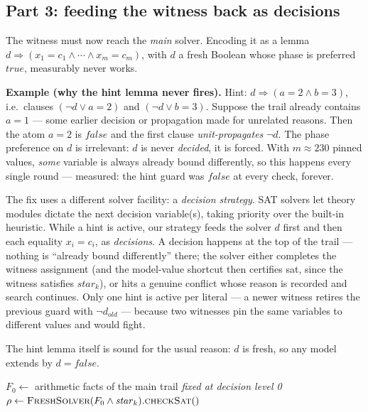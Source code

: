 \documentclass[11pt]{article}
\newcommand{\true}{\ensuremath{\mathit{true}}\xspace}
\newcommand{\false}{\ensuremath{\mathit{false}}\xspace}
\begin{document}
\subsection{Part 3: feeding the witness back as decisions}

The witness must now reach the \emph{main} solver. Encoding it as a lemma
$d \Rightarrow (x_1 = c_1 \wedge \cdots \wedge x_m = c_m)$, with $d$ a
fresh Boolean whose phase is preferred \true, measurably never works.

\begin{exbox}
\textbf{Example (why the hint lemma never fires).} Hint:
$d \Rightarrow (a = 2 \wedge b = 3)$, i.e.\ clauses
$(\neg d \vee a{=}2)$ and $(\neg d \vee b{=}3)$. Suppose the trail
already contains $a = 1$ --- some earlier decision or propagation made for
unrelated reasons. Then the atom $a{=}2$ is \false{} and the first clause
\emph{unit-propagates} $\neg d$. The phase preference on $d$ is
irrelevant: $d$ is never \emph{decided}, it is forced. With $m \approx
230$ pinned values, \emph{some} variable is always already bound
differently, so this happens every single round --- measured: the hint
guard was \false{} at every check, forever.
\end{exbox}

The fix uses a different solver facility: a \emph{decision strategy}. SAT
solvers let theory modules dictate the next decision variable(s), taking
priority over the built-in heuristic. While a hint is active, our strategy
feeds the solver $d$ first and then each equality $x_i = c_i$, as
\emph{decisions}. A decision happens at the top of the trail --- nothing is
``already bound differently'' there; the solver either completes the
witness assignment (and the model-value shortcut then certifies
\textsf{sat}, since the witness satisfies $\mathit{star}_k$), or hits a
genuine conflict whose reason is recorded and search continues. Only one
hint is active per literal --- a newer witness retires the previous guard
with $\neg d_{\mathit{old}}$ --- because two witnesses pin the same
variables to different values and would fight.

The hint lemma itself is sound for the usual reason: $d$ is fresh, so any
model extends by $d = \false$.

\begin{algorithm}[H]
\caption{\textsc{Endgame}: decoupled witness search, with feedback (\textsf{sat}) and cuts (\textsf{unsat})}
\label{alg:endgame}
$F_0 \gets$ arithmetic facts of the main trail \emph{fixed at decision level 0}\;
$\rho \gets \textsc{FreshSolver}(F_0 \wedge \mathit{star}_k).\textsc{checkSat}()$ 
\end{algorithm}
\end{document}
